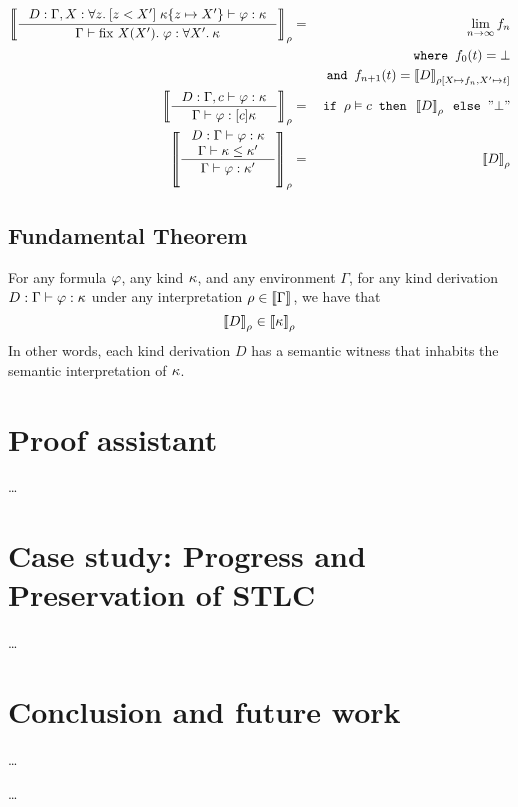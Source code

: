 \documentclass[english, mgr]{iithesis}
\begin{document}
\begin{eqnarray*}
    \interp{\inference{
            D : \types[{\Gamma, X : {\all[z]{[z < \termv']}}\;\kind\subst{z}{\termv'}}]\formphi\kind
        }{
            \types{\fix{X}{\termv'}\formphi}{\all[\termv']\kind}
        }} & = & \lim_{n \rightarrow \infty} f_n
    \\
    & & \texttt{ where } f_0(t) = \bot \\
    & & \texttt{ and } f_{n+1}(t) = \interp[{\tmEnv[X\mapsto f_n, \termv' \mapsto t]}]{D} \\
    \interp{\inference{
            D : \types[\Gamma, c]\formphi\kind
        }{
            \types{\formphi}{[c]\kind}
        }} & = & \texttt{if } \tmEnv \vDash c \texttt{ then } \interp{D} \texttt{ else } \text{''}\bot\text{''}
    \\
    \interp{\inference{
            D : \types\formphi\kind \\
            \rel[\Gamma] \kind \leq \kind'
        }{
            \types{\formphi}{\kind'}
        }} & = &  \interp{D}
\end{eqnarray*}

\section{Fundamental Theorem}
For any formula $\formphi$, any kind $\kind$, and any environment $\Gamma$, for any kind derivation $D : \types\formphi\kind$ under any interpretation $\tmEnv \in \interp[]{\Gamma}$, we have that
$$
    \interp{D} \in \interp{\kind}
$$
In other words, each kind derivation $D$ has a semantic witness that inhabits the semantic interpretation of $\kind$.
\chapter{Proof assistant}

\dots

\chapter{Case study: Progress and Preservation of STLC}

\dots

\chapter{Conclusion and future work}

\dots


\begin{thebibliography}{1}
 \ldots
\end{thebibliography}
\end{document}
